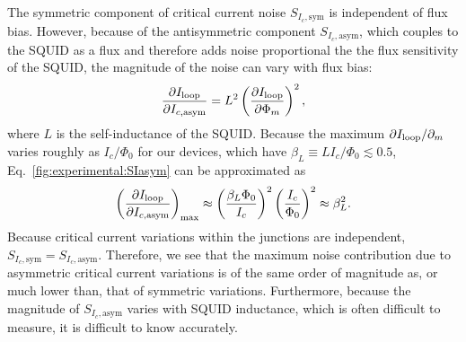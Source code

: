 The symmetric component of critical current noise $S_{I_c,\text{sym}}$ is independent of flux bias. However, because of the antisymmetric component $S_{I_c,\text{asym}}$, which couples to the SQUID as a flux and therefore adds noise proportional the the flux sensitivity of the SQUID, the magnitude of the noise can vary with flux bias:
\begin{align}\label{fig:experimental:SIasym}
\frac{\partial\Iloop}{\partial I_{c,\text{asym}}} = L^2 %
\left(\frac{\partial \Iloop}{\partial \Phi_m}\right)^2,
\end{align}
where $L$ is the self-inductance of the SQUID. Because the maximum $\partial I_\text{loop}/\partial_m$ varies roughly as $I_c/\Phi_0$ for our devices, which have $\beta_L \equiv LI_c/\Phi_0 \lesssim 0.5$, Eq.~\eqref{fig:experimental:SIasym} can be approximated as
\begin{align}\label{fig:experimental:SIasym}
\left(\frac{\partial\Iloop}{\partial I_{c,\text{asym}}}\right)_{\text{max}} \approx %
\left(\frac{\beta_L\Phi_0}{I_c}\right)^2 %
\left(\frac{I_c}{\Phi_0}\right)^2 %
\approx \beta_L^2.
\end{align}
Because critical current variations within the junctions are independent, $S_{I_c,\text{sym}} = S_{I_c,\text{asym}}$. Therefore, we see that the maximum noise contribution due to asymmetric critical current variations is of the same order of magnitude as, or much lower than, that of symmetric variations. Furthermore, because the magnitude of $S_{I_c,\text{asym}}$ varies with SQUID inductance, which is often difficult to measure, it is difficult to know accurately.